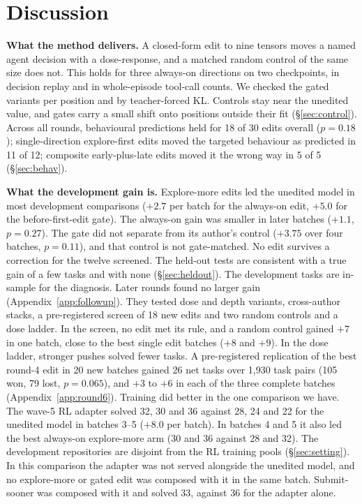 \section{Discussion}
\label{sec:discussion}
\textbf{What the method delivers.} A closed-form edit to nine tensors moves a named agent decision with a dose-response, and a matched random control of the same size does not. This holds for three always-on directions on two checkpoints, in decision replay and in whole-episode tool-call counts. We checked the gated variants per position and by teacher-forced KL. Controls stay near the unedited value, and gates carry a small shift onto positions outside their fit (\S\ref{sec:control}). Across all rounds, behavioural predictions held for 18 of 30 edits overall ($p = 0.18$); single-direction explore-first edits moved the targeted behaviour as predicted in 11 of 12; composite early-plus-late edits moved it the wrong way in 5 of 5 (\S\ref{sec:behav}).

\textbf{What the development gain is.} Explore-more edits led the unedited model in most development comparisons ($+2.7$ per batch for the always-on edit, $+5.0$ for the before-first-edit gate). The always-on gain was smaller in later batches ($+1.1$, $p = 0.27$). The gate did not separate from its author's control ($+3.75$ over four batches, $p = 0.11$), and that control is not gate-matched. No edit survives a correction for the twelve screened. The held-out tests are consistent with a true gain of a few tasks and with none (\S\ref{sec:heldout}). The development tasks are in-sample for the diagnosis. Later rounds found no larger gain (Appendix~\ref{app:followup}). They tested dose and depth variants, cross-author stacks, a pre-registered screen of 18 new edits and two random controls and a dose ladder. In the screen, no edit met its rule, and a random control gained $+7$ in one batch, close to the best single edit batches ($+8$ and $+9$). In the dose ladder, stronger pushes solved fewer tasks. A pre-registered replication of the best round-4 edit in 20 new batches gained 26 net tasks over 1,930 task pairs (105 won, 79 lost, $p = 0.065$), and $+3$ to $+6$ in each of the three complete batches (Appendix~\ref{app:round6}). Training did better in the one comparison we have. The wave-5 RL adapter solved 32, 30 and 36 against 28, 24 and 22 for the unedited model in batches 3--5 ($+8.0$ per batch). In batches 4 and 5 it also led the best always-on explore-more arm (30 and 36 against 28 and 32). The development repositories are disjoint from the RL training pools (\S\ref{sec:setting}). In this comparison the adapter was not served alongside the unedited model, and no explore-more or gated edit was composed with it in the same batch. Submit-sooner was composed with it and solved 33, against 36 for the adapter alone.

